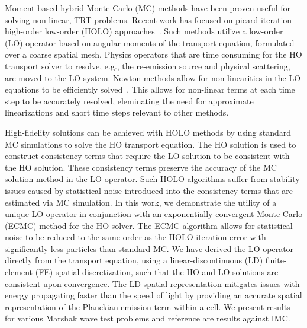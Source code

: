 \documentclass{mc2013}
\begin{document}
Moment-based hybrid Monte Carlo (MC) methods have been proven useful for solving
non-linear, TRT problems. Recent work has focused on picard iteration high-order low-order
(HOLO) approaches~\cite{willert,park,rmc}.   Such methods utilize a low-order (LO) operator based on angular moments of the
transport equation, formulated over a coarse spatial mesh.
Physics operators that are time
consuming for the HO transport solver to resolve, e.g., the re-emission source and
physical scattering, are moved to the LO system.  
Newton methods allow for non-linearities in the LO equations to
be efficiently solved~\cite{willert}. This allows for non-linear
terms at each time step to be accurately resolved, eleminating the need for
approximate linearizations and short time steps relevant to other methods.

High-fidelity solutions can be achieved with HOLO methods by using standard
MC simulations to solve the HO transport
equation. The HO solution is used to construct consistency
terms that require the LO solution to be consistent with the HO solution.  These
consistency terms preserve
the accuracy of the MC solution method in the LO operator. Such HOLO algorithms suffer from stability issues caused by statistical noise introduced into the
consistency terms that are estimated via MC simulation.  
In this work, we demonstrate the utility of a unique LO operator in conjunction with
an exponentially-convergent Monte
Carlo (ECMC) method\cite{jake} for the HO solver.  The ECMC algorithm
allows for statistical noise to be reduced to the same order as the HOLO iteration
error with significantly less particles than standard MC. We have derived the LO operator
directly from the transport equation, using a linear-discontinuous (LD)
finite-element (FE) spatial
discretization, such that the
HO and LO solutions are consistent upon convergence. The LD spatial representation
mitigates issues with energy propagating faster than the speed of light by providing an
accurate spatial representation of the Planckian emission term within a cell.  We
present results for various Marshak wave test problems and reference are results
against IMC.


\end{document}
